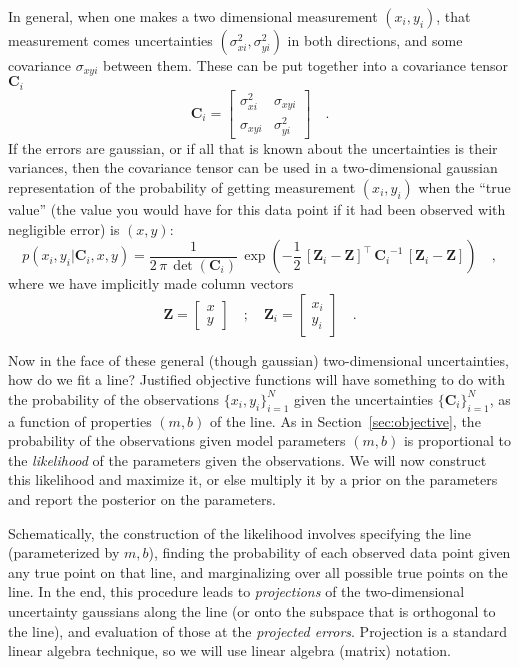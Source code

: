 \documentclass[12pt]{article}
\newcommand{\sectionname}{Section}
\newcommand{\mmatrix}[1]{\boldsymbol{#1}}
\newcommand{\inverse}[1]{{#1}^{-1}}
\newcommand{\transpose}[1]{{#1}^{\scriptscriptstyle \top}}
\newcommand{\mC}{\mmatrix{C}}
\newcommand{\mZ}{\mmatrix{Z}}
\newcommand{\setofall}[3]{\{{#1}\}_{{#2}}^{{#3}}}
\newcommand{\allxy}{\setofall{x_i,y_i}{i=1}{N}}
\newcommand{\allC}{\setofall{\mC_i}{i=1}{N}}
\begin{document}
In general, when one makes a two dimensional measurement $(x_i,y_i)$,
that measurement comes uncertainties $(\sigma_{xi}^2,\sigma_{yi}^2)$
in both directions, and some covariance $\sigma_{xyi}$ between them.
These can be put together into a covariance tensor $\mC_i$
\begin{equation}
\mC_i = \left[\begin{array}{cc}
\sigma_{xi}^2 & \sigma_{xyi} \\ \sigma_{xyi} & \sigma_{yi}^2
\end{array}\right] \quad .
\end{equation}
If the errors are gaussian, or if all that is known about the
uncertainties is their variances, then the covariance tensor can be
used in a two-dimensional gaussian representation of the probability
of getting measurement $(x_i,y_i)$ when the ``true value'' (the value
you would have for this data point if it had been observed with
negligible error) is $(x,y)$:
\begin{equation}
p(x_i,y_i|\mC_i,x,y) = \frac{1}{2\,\pi\,\det(\mC_i)}
  \,\exp\left(-\frac{1}{2}\,\transpose{\left[\mZ_i - \mZ\right]}
  \,\inverse{\mC_i}\,\left[\mZ_i - \mZ\right]\right) \quad ,
\end{equation}
where we have implicitly made column vectors
\begin{equation}\label{eq:mZ}
\mZ = \left[\begin{array}{c} x \\ y \end{array}\right] \quad ; \quad
\mZ_i = \left[\begin{array}{c} x_i \\ y_i \end{array}\right] \quad .
\end{equation}

Now in the face of these general (though gaussian) two-dimensional
uncertainties, how do we fit a line?  Justified objective functions
will have something to do with the probability of the observations
$\allxy$ given the uncertainties $\allC$, as a function of properties
$(m,b)$ of the line.  As in \sectionname~\ref{sec:objective}, the
probability of the observations given model parameters $(m,b)$ is
proportional to the \emph{likelihood} of the parameters given the
observations.  We will now construct this likelihood and maximize it,
or else multiply it by a prior on the parameters and report the
posterior on the parameters.

Schematically, the construction of the likelihood involves specifying
the line (parameterized by $m,b$), finding the probability of each
observed data point given any true point on that line, and
marginalizing over all possible true points on the line.  In the end,
this procedure leads to \emph{projections} of the two-dimensional
uncertainty gaussians along the line (or onto the subspace that is
orthogonal to the line), and evaluation of those at the
\emph{projected errors}.  Projection is a standard linear algebra
technique, so we will use linear algebra (matrix) notation.
\end{document}
